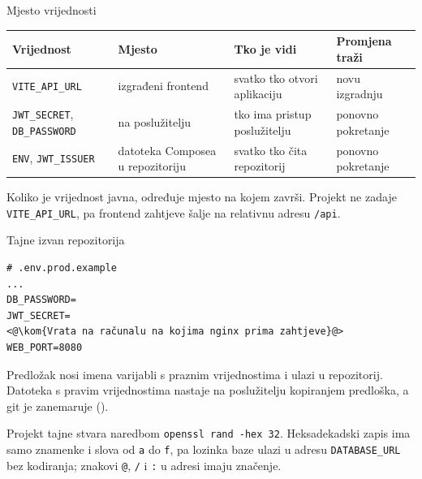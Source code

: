 \begin{frame}{Mjesto vrijednosti}
\vspace{0.3em}
\begin{center}
{\small
\setlength{\tabcolsep}{5pt}
\renewcommand{\arraystretch}{1.35}
\begin{tabular}{@{}L{2.7cm}L{3.5cm}L{3.1cm}L{2.3cm}@{}}
  \toprule
  \textbf{Vrijednost} & \textbf{Mjesto} & \textbf{Tko je vidi} & \textbf{Promjena traži} \\
  \midrule
  \texttt{VITE\_API\_URL} & izgrađeni frontend & svatko tko otvori aplikaciju & novu izgradnju \\
  \texttt{JWT\_SECRET}, \texttt{DB\_PASSWORD} &  na poslužitelju & tko ima pristup poslužitelju & ponovno pokretanje \\
  \texttt{ENV}, \texttt{JWT\_ISSUER} & datoteka Composea u repozitoriju & svatko tko čita repozitorij & ponovno pokretanje \\
  \bottomrule
\end{tabular}
}
\end{center}

\vspace{0.6em}
Koliko je vrijednost javna, određuje mjesto na kojem završi. Projekt ne zadaje \texttt{VITE\_API\_URL}, pa frontend zahtjeve šalje na relativnu adresu \texttt{/api}.
\end{frame}

\begin{frame}[fragile]{Tajne izvan repozitorija}
\begin{lstlisting}
# .env.prod.example
...
DB_PASSWORD=
JWT_SECRET=
<@\kom{Vrata na računalu na kojima nginx prima zahtjeve}@>
WEB_PORT=8080
\end{lstlisting}

\vspace{0.3em}
Predložak nosi imena varijabli s praznim vrijednostima i ulazi u repozitorij. Datoteka  s pravim vrijednostima nastaje na poslužitelju kopiranjem predloška, a git je zanemaruje ().

\vspace{0.4em}
\begin{konvencija}
Projekt tajne stvara naredbom \texttt{openssl rand -hex 32}. Heksadekadski zapis ima samo znamenke i slova od \texttt{a} do \texttt{f}, pa lozinka baze ulazi u adresu \texttt{DATABASE\_URL} bez kodiranja; znakovi \texttt{@}, \texttt{/} i \texttt{:} u adresi imaju značenje.
\end{konvencija}
\end{frame}

